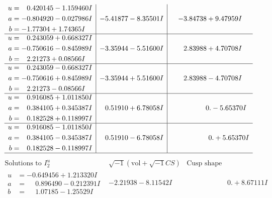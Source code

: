 \documentclass[1p]{elsarticle_modified}
\theoremstyle{definition}
\newcommand{\I}{\sqrt{-1}}
\begin{document}
$$\begin{array}{c|c|c}
\begin{aligned}
u &= \phantom{-}0.420145 - 1.159460 I \\
a &= -0.804920 - 0.027986 I \\
b &= -1.77304 + 1.74365 I\end{aligned}
 & -5.41877 - 8.35501 I & -3.84738 + 9.47959 I \\ \hline\begin{aligned}
u &= \phantom{-}0.243059 + 0.668327 I \\
a &= -0.750616 - 0.845989 I \\
b &= \phantom{-}2.21273 + 0.08566 I\end{aligned}
 & -3.35944 - 5.51600 I & \phantom{-}2.83988 + 4.70708 I \\ \hline\begin{aligned}
u &= \phantom{-}0.243059 - 0.668327 I \\
a &= -0.750616 + 0.845989 I \\
b &= \phantom{-}2.21273 - 0.08566 I\end{aligned}
 & -3.35944 + 5.51600 I & \phantom{-}2.83988 - 4.70708 I \\ \hline\begin{aligned}
u &= \phantom{-}0.916085 + 1.011850 I \\
a &= \phantom{-}0.384105 + 0.345387 I \\
b &= \phantom{-}0.182528 + 0.118997 I\end{aligned}
 & \phantom{-}0.51910 + 6.78058 I & \phantom{-0.000000 } 0. - 5.65370 I \\ \hline\begin{aligned}
u &= \phantom{-}0.916085 - 1.011850 I \\
a &= \phantom{-}0.384105 - 0.345387 I \\
b &= \phantom{-}0.182528 - 0.118997 I\end{aligned}
 & \phantom{-}0.51910 - 6.78058 I & \phantom{-0.000000 -}0. + 5.65370 I\\
 \hline 
 \end{array}$$\newpage$$\begin{array}{c|c|c}  
\text{Solutions to }I^u_{2}& \I (\text{vol} + \sqrt{-1}CS) & \text{Cusp shape}\\
 \hline 
\begin{aligned}
u &= -0.649456 + 1.213320 I \\
a &= \phantom{-}0.896490 - 0.212391 I \\
b &= \phantom{-}1.07185 - 1.25529 I\end{aligned}
 & -2.21938 - 8.11542 I & \phantom{-0.000000 -}0. + 8.67111 I \\ \hline\begin{aligned}

\end{aligned}
\end{array}$$
\end{document}
